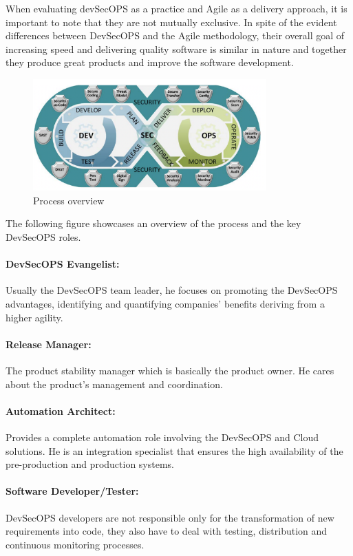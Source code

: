 When evaluating devSecOPS as a practice and Agile as a delivery approach, it is important to note that they are not mutually exclusive. In spite of the evident differences between DevSecOPS and the Agile methodology, their overall goal of increasing speed and delivering quality software is similar in nature and together they produce great products and improve the software development.

\begin{figure}[!ht]\centering
\includegraphics[width=0.8\textwidth,angle=00]{assets/f1.png}
\caption{Process overview}
\label{fig:processOverview}
\end{figure}

The following figure showcases an overview of the process and the key DevSecOPS roles. 
\paragraph{DevSecOPS Evangelist:} 
Usually the DevSecOPS team leader, he focuses on promoting the DevSecOPS advantages, identifying and quantifying companies’ benefits deriving from a higher agility. 

\paragraph{Release Manager:} 
The product stability manager which is basically the product owner. He cares about the product’s management and coordination. 

\paragraph{Automation Architect: }
Provides a complete automation role involving the DevSecOPS and Cloud solutions. He is an integration specialist that ensures the high availability of the pre-production and production systems. 

\paragraph{Software Developer/Tester:}
DevSecOPS developers are not responsible only for the transformation of new requirements into code, they also have to deal with testing, distribution and continuous monitoring processes.

